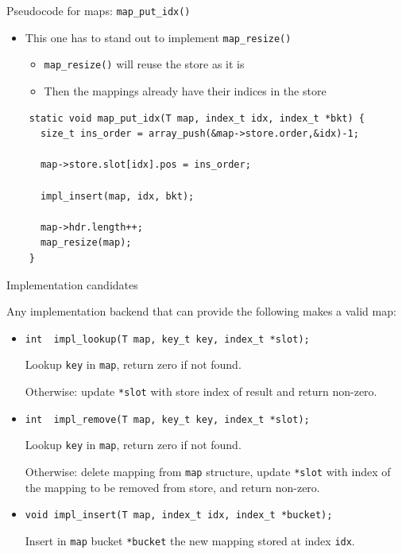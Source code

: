 \begin{frame}[fragile]{Pseudocode for maps: \lstinline{map_put_idx()}}

  \begin{itemize}
  \item This one has to stand out to implement \lstinline{map_resize()}
    \begin{itemize}
    \item \lstinline{map_resize()} will reuse the store as it is
    \item Then the mappings already have their indices in the store
    \end{itemize}
  \end{itemize}

  \begin{lstlisting}
    static void map_put_idx(T map, index_t idx, index_t *bkt) {
      size_t ins_order = array_push(&map->store.order,&idx)-1;

      map->store.slot[idx].pos = ins_order;

      impl_insert(map, idx, bkt);
      
      map->hdr.length++;
      map_resize(map);
    }
  \end{lstlisting}

\end{frame}


\begin{frame}[fragile]{Implementation candidates}

  Any implementation backend that can provide the following makes a valid map:

  \begin{itemize}
  \item \lstinline{int  impl_lookup(T map, key_t key, index_t *slot);}

    Lookup \lstinline{key} in \lstinline{map}, return zero if not found.
    
    Otherwise: update \lstinline{*slot} with store index of result and return non-zero.
  \item \lstinline{int  impl_remove(T map, key_t key, index_t *slot);}

    Lookup \lstinline{key} in \lstinline{map}, return zero if not found.
    
    Otherwise: delete mapping from \lstinline{map} structure, update \lstinline{*slot} with index of the mapping to be removed from store, and return non-zero.
  \item \lstinline{void impl_insert(T map, index_t idx, index_t *bucket);}

    Insert in \lstinline{map} bucket \lstinline{*bucket} the new mapping stored at index \lstinline{idx}.
  \end{itemize}

\end{frame}


